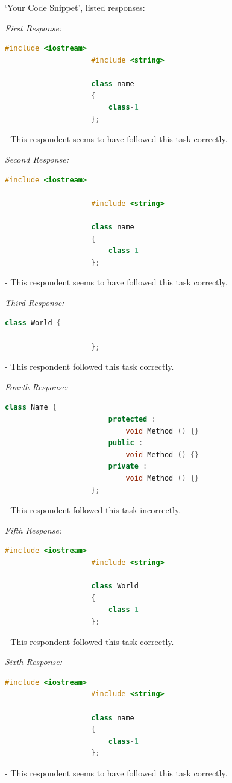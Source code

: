 \documentclass[12pt]{report} %
\begin{document}
				`Your Code Snippet', listed responses:
				
				\textit{First Response:} 
				\begin{lstlisting}[language=c++]
					#include <iostream>
					#include <string>
					
					class name
					{
						class-1
					};
				\end{lstlisting} - This respondent seems to have followed this task correctly.

				\textit{Second Response:}
				\begin{lstlisting}[language=c++]
					#include <iostream>

					#include <string>

					class name
					{
						class-1
					};
				\end{lstlisting} - This respondent seems to have followed this task correctly.

				\textit{Third Response:}
				\begin{lstlisting}[language=java]
					class World {

					};
				\end{lstlisting} - This respondent followed this task correctly.

				\textit{Fourth Response:}
				\begin{lstlisting}[language=c++]
					class Name {
						protected :
							void Method () {}
						public :
							void Method () {}
						private :
							void Method () {}
					};
				\end{lstlisting} - This respondent followed this task incorrectly.

				\textit{Fifth Response:}
				\begin{lstlisting}[language=c++]
					#include <iostream>
					#include <string>

					class World
					{
						class-1
					};
				\end{lstlisting} - This respondent followed this task correctly.

				\textit{Sixth Response:}
				\begin{lstlisting}[language=c++]
					#include <iostream>
					#include <string>

					class name
					{
						class-1
					};
				\end{lstlisting} - This respondent seems to have followed this task correctly.
\end{document}
